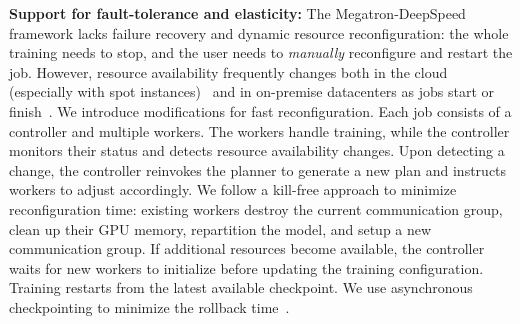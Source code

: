 \textbf{Support for fault-tolerance and elasticity:} The Megatron-DeepSpeed framework lacks failure recovery and dynamic resource reconfiguration: the whole training needs to stop, and the user needs to \textit{manually} reconfigure and restart the job. However, resource availability frequently changes both in the cloud (especially with spot instances)~\cite{Thorpe23Bamboo, strati24crossregion} and in on-premise datacenters as jobs start or finish~\cite{wagenlander24tenplex}. We introduce modifications for fast reconfiguration. Each job consists of a controller and multiple workers. The workers handle training, while the controller monitors their status and detects resource availability changes. Upon detecting a change, the controller reinvokes the planner to generate a new plan and instructs workers to adjust accordingly. We follow a kill-free approach to minimize reconfiguration time: existing workers destroy the current communication group, clean up their GPU memory, repartition the model, and setup a new communication group.  If additional resources become available, the controller waits for new workers to initialize before updating the training configuration.  Training restarts from the latest available checkpoint.
We use asynchronous checkpointing to minimize the rollback time~\cite{Mohan21CheckFreq, strati25pccheck}.
